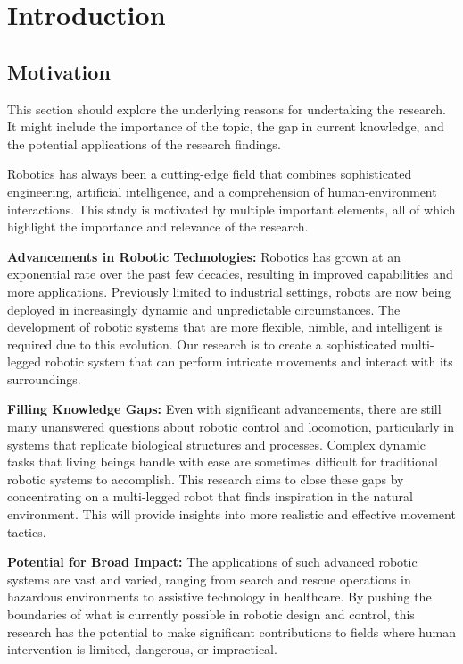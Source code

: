 \chapter{Introduction}

\graphicspath{{./Figures/Modeling}}



\section{Motivation}
This section should explore the underlying reasons for undertaking the research. It might include the importance of the topic, the gap in current knowledge, and the potential applications of the research findings.



Robotics has always been a cutting-edge field that combines sophisticated engineering, artificial intelligence, and a comprehension of human-environment interactions. This study is motivated by multiple important elements, all of which highlight the importance and relevance of the research.

\textbf{Advancements in Robotic Technologies:} Robotics has grown at an exponential rate over the past few decades, resulting in improved capabilities and more applications. Previously limited to industrial settings, robots are now being deployed in increasingly dynamic and unpredictable circumstances. The development of robotic systems that are more flexible, nimble, and intelligent is required due to this evolution. Our research is to create a sophisticated multi-legged robotic system that can perform intricate movements and interact with its surroundings.

\textbf{Filling Knowledge Gaps:} Even with significant advancements, there are still many unanswered questions about robotic control and locomotion, particularly in systems that replicate biological structures and processes. Complex dynamic tasks that living beings handle with ease are sometimes difficult for traditional robotic systems to accomplish. This research aims to close these gaps by concentrating on a multi-legged robot that finds inspiration in the natural environment. This will provide insights into more realistic and effective movement tactics.

\textbf{Potential for Broad Impact:} The applications of such advanced robotic systems are vast and varied, ranging from search and rescue operations in hazardous environments to assistive technology in healthcare. By pushing the boundaries of what is currently possible in robotic design and control, this research has the potential to make significant contributions to fields where human intervention is limited, dangerous, or impractical.

